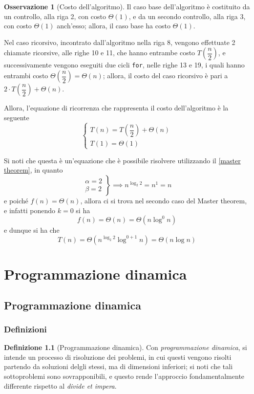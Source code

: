 \documentclass[14pt]{extreport}
\theoremstyle{definition}
\newtheorem{definition}{Definizione}[subsection]
\theoremstyle{definition}
\newtheorem{remark}{Osservazione}[subsection]
\begin{document}
\begin{remark}[Costo dell'algoritmo]
    Il caso base dell'algoritmo è costituito da un controllo, alla riga 2, con costo $\Theta(1)$, e da un secondo controllo, alla riga 3, con costo $\Theta(1)$ anch'esso; allora, il caso base ha costo $\Theta(1)$.

    Nel caso ricorsivo, incontrato dall'algoritmo nella riga 8, vengono effettuate 2 chiamate ricorsive, alle righe 10 e 11, che hanno entrambe costo $T\left(\dfrac{n}{2}\right)$, e successivamente vengono eseguiti due cicli \texttt{for}, nelle righe 13 e 19, i quali hanno entrambi costo $\Theta\left(\dfrac{n}{2}\right) = \Theta(n)$; allora, il costo del caso ricorsivo è pari a $2 \cdot T\left(\dfrac{n}{2}\right) + \Theta(n)$.

    Allora, l'equazione di ricorrenza che rappresenta il costo dell'algoritmo è la seguente $$\left \{ \begin{array}{l} T(n) = T\left(\dfrac{n}{2}\right) + \Theta(n) \\ T(1) = \Theta(1) \end{array} \right .$$

    Si noti che questa è un'equazione che è possibile risolvere utilizzando il \cref{master theorem}, in quanto $$\left . \begin{array}{l} \alpha = 2 \\ \beta = 2 \end{array} \right \} \implies n ^ {\log_{2}{2}} = n^1 = n$$ e poiché $f(n) = \Theta(n)$, allora ci si trova nel secondo caso del Master theorem, e infatti ponendo $k = 0$ si ha $$f(n) = \Theta(n) = \Theta(n \log^0 n)$$ e dunque si ha che $$T(n) = \Theta(n ^{\log_{2}{2}} \log ^ {0 + 1}n) = \Theta(n \log n)$$
\end{remark}

\chapter{Programmazione dinamica}

\section{Programmazione dinamica}

\subsection{Definizioni}

\begin{definition}[Programmazione dinamica]
    Con \textit{programmazione dinamica}, si intende un processo di risoluzione dei problemi, in cui questi vengono risolti partendo da soluzioni delgli stessi, ma di dimensioni inferiori; si noti che tali sottoproblemi sono sovrapponibili, e questo rende l'approccio fondamentalmente differente rispetto al \textit{divide et impera}.
\end{definition}
\end{document}
